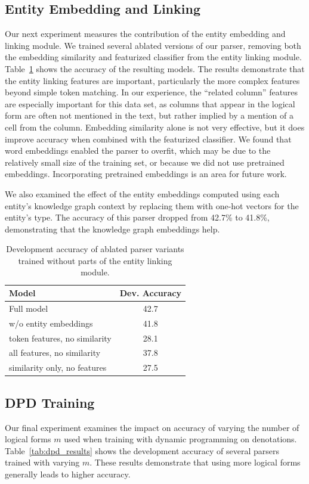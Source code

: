 \subsection{Entity Embedding and Linking}
Our next experiment measures the contribution of the entity embedding and
linking module. We trained several ablated versions of our parser, removing both
the embedding similarity and featurized classifier from the entity linking
module. Table~\ref{tab:el_results} shows the accuracy of the resulting models.
The results demonstrate that the entity linking features are important,
particularly the more complex features beyond simple token matching. In our
experience, the ``related column'' features are especially important for this
data set, as columns that appear in the logical form are often not mentioned in
the text, but rather implied by a mention of a cell from the column. Embedding
similarity alone is not very effective, but it does improve accuracy when
combined with the featurized classifier. We found that word embeddings enabled
the parser to overfit, which may be due to the relatively small size of the
training set, or because we did not use pretrained embeddings. Incorporating
pretrained embeddings is an area for future work.

We also examined the effect of the entity embeddings computed using each
entity's knowledge graph context by replacing them with one-hot vectors for the
entity's type. The accuracy of this parser dropped from 42.7\% to 41.8\%,
demonstrating that the knowledge graph embeddings help.

\begin{table}
	\centering
	\begin{tabular}{lc} \toprule
	\textbf{Model} & \textbf{Dev. Accuracy} \\ \midrule 
	Full model & 42.7 \\ 
        \quad w/o entity embeddings & 41.8 \\
	\quad token features, no similarity & 28.1 \\
	\quad all features, no similarity & 37.8 \\
	\quad similarity only, no features & 27.5 \\ \bottomrule
	\end{tabular}
	\caption{Development accuracy of ablated parser variants
	trained without parts of the entity linking module.}\label{tab:el_results}
\end{table}

\subsection{DPD Training}
\label{sec:experiments_dpd}
Our final experiment examines the impact on accuracy of varying the number of
logical forms $m$ used when training with dynamic programming on denotations.
Table~\ref{tab:dpd_results} shows the development accuracy of several parsers
trained with varying $m$. These results demonstrate that using more logical
forms generally leads to higher accuracy.

